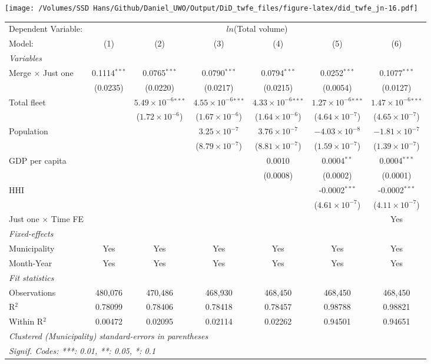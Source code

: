 \documentclass[
]{article}
\begin{document}
\texttt{[image: /Volumes/SSD Hans/Github/Daniel\_UWO/Output/DiD\_twfe\_files/figure-latex/did\_twfe\_jn-16.pdf]}

\begin{tabular}{lcccccc}
\tabularnewline\midrule\midrule
Dependent Variable:&\multicolumn{6}{c}{$ln$(Total volume)}\\
Model:&(1) & (2) & (3) & (4) & (5) & (6)\\
\midrule \emph{Variables}&   &   &   &   &   &  \\
Merge $\times $ Just one & 0.1114$^{***}$ & 0.0765$^{***}$ & 0.0790$^{***}$ & 0.0794$^{***}$ & 0.0252$^{***}$ & 0.1077$^{***}$\\
  &(0.0235) & (0.0220) & (0.0217) & (0.0215) & (0.0054) & (0.0127)\\
Total fleet &    & $5.49\times 10^{-6}$$^{***}$ & $4.55\times 10^{-6}$$^{***}$ & $4.33\times 10^{-6}$$^{***}$ & $1.27\times 10^{-6}$$^{***}$ & $1.47\times 10^{-6}$$^{***}$\\
  &   & ($1.72\times 10^{-6}$) & ($1.67\times 10^{-6}$) & ($1.64\times 10^{-6}$) & ($4.64\times 10^{-7}$) & ($4.65\times 10^{-7}$)\\
Population &    &    & $3.25\times 10^{-7}$ & $3.76\times 10^{-7}$ & $-4.03\times 10^{-8}$ & $-1.81\times 10^{-7}$\\
  &   &    & ($8.79\times 10^{-7}$) & ($8.81\times 10^{-7}$) & ($1.59\times 10^{-7}$) & ($1.39\times 10^{-7}$)\\
GDP per capita &    &    &    & 0.0010 & 0.0004$^{**}$ & 0.0004$^{***}$\\
  &   &    &    & (0.0008) & (0.0002) & (0.0001)\\
HHI &    &    &    &    & -0.0002$^{***}$ & -0.0002$^{***}$\\
  &   &    &    &    & ($4.61\times 10^{-7}$) & ($4.11\times 10^{-7}$)\\
Just one $\times$ Time FE &  &  &  &  &  & Yes\\
\midrule \emph{Fixed-effects}&   &   &   &   &   &  \\
Municipality & Yes & Yes & Yes & Yes & Yes & Yes\\
Month-Year & Yes & Yes & Yes & Yes & Yes & Yes\\
\midrule \emph{Fit statistics}&  & & & & & \\
Observations & 480,076&470,486&468,930&468,450&468,450&468,450\\
R$^2$ & 0.78099&0.78406&0.78418&0.78457&0.98788&0.98821\\
Within R$^2$ & 0.00472&0.02095&0.02114&0.02262&0.94501&0.94651\\
\midrule\midrule\multicolumn{7}{l}{\emph{Clustered (Municipality) standard-errors in parentheses}}\\
\multicolumn{7}{l}{\emph{Signif. Codes: ***: 0.01, **: 0.05, *: 0.1}}\\
\end{tabular}
\end{document}
